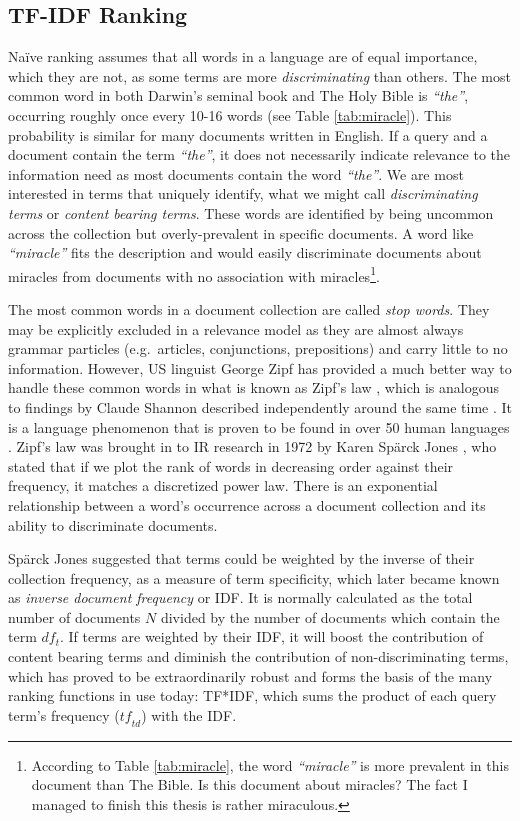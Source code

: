 \subsection{TF-IDF Ranking}
Na{\"i}ve ranking assumes that all words in a language are of equal importance, which they are not, as some terms are more \textit{discriminating} than others. The most common word in both Darwin's seminal book and The Holy Bible is \textit{``the''}, occurring roughly once every 10-16 words (see Table \ref{tab:miracle}). This probability is similar for many documents written in English. If a query and a document contain the term \textit{``the''}, it does not necessarily indicate relevance to the information need as most documents contain the word \textit{``the''}. We are most interested in terms that uniquely identify, what we might call \textit{discriminating terms} or \textit{content bearing terms}. These words are identified by being uncommon across the collection but overly-prevalent in specific documents. A word like \textit{``miracle''} fits the description and would easily discriminate documents about miracles from documents with no association with miracles\footnote{According to Table \ref{tab:miracle}, the word \textit{``miracle''} is more prevalent in this document than The Bible. Is this document about miracles? The fact I managed to finish this thesis is rather miraculous.}.

The most common words in a document collection are called \textit{stop words}. They may be explicitly excluded in a relevance model as they are almost always grammar particles (e.g.\ articles, conjunctions, prepositions) and carry little to no information. However, US linguist George Zipf has provided a much better way to handle these common words in what is known as Zipf's law \cite{zipf1949human}, which is analogous to findings by Claude Shannon described independently around the same time \cite{shannon1948mathematical}. It is a language phenomenon that is proven to be found in over 50 human languages \cite{yu2018zipf}. Zipf's law was brought in to IR research in 1972 by Karen Sp{\"a}rck Jones \cite{jones1972statistical}, who stated that if we plot the rank of words in decreasing order against their frequency, it matches a discretized power law. There is an exponential relationship between a word's occurrence across a document collection and its ability to discriminate documents.

Sp{\"a}rck Jones suggested that terms could be weighted by the inverse of their collection frequency, as a measure of term specificity, which later became known as \textit{inverse document frequency} or IDF. It is normally calculated as the total number of documents $N$ divided by the number of documents which contain the term ${df_{t}}$. If terms are weighted by their IDF, it will boost the contribution of content bearing terms and diminish the contribution of non-discriminating terms, which has proved to be extraordinarily robust and forms the basis of the many ranking functions in use today: TF*IDF, which sums the product of each query term's frequency ($\mathit{tf}_{td}$) with the IDF.

